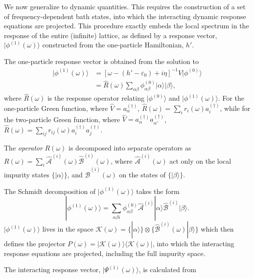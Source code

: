 \documentclass[aps,twocolumn,nobibnotes]{revtex4}
\begin{document}
We now generalize to dynamic quantities. This requires the construction of a set of frequency-dependent bath states, into which the
interacting dynamic response equations are projected. This procedure exactly embeds the local spectrum in the response of the entire (infinite) lattice, 
as defined by a response vector, $|\phi^{(1)}(\omega) \rangle$ constructed from the one-particle Hamiltonian, $h'$.
\begin{inparaenum}
\item The one-particle response vector is obtained from the solution to
\begin{align}
|\phi^{(1)}(\omega) \rangle &= \left[ \omega-(h'-\varepsilon_0)+i\eta \right]^{-1} {\hat V} |\phi^{(0)}\rangle  \nonumber \\ 
                            &= {\hat R}(\omega) \sum_{\alpha \beta} \phi^{(0)}_{\alpha \beta} |\alpha \rangle |\beta \rangle    ,
\end{align}
where ${\hat R}(\omega)$ is the response operator relating $| \phi^{(0)} \rangle$ and $| \phi^{(1)}(\omega) \rangle$. For the one-particle Green 
function, where ${\hat V} = a_{\alpha}^{(\dagger)}$, ${\hat R}(\omega) = \sum_i r_i(\omega) a_i^{(\dagger)}$, while for the two-particle Green function, 
where ${\hat V}=a_{\alpha}^{(\dagger)} a_{\alpha'}^{(\dagger)}$, ${\hat R}(\omega) = \sum_{ij} r_{ij}(\omega) a_i^{(\dagger)} a_j^{(\dagger)}$.
\item The {\em operator} $R(\omega)$ is decomposed into separate operators as $R(\omega) = \sum_i {\hat {\mathcal{A}}}^{(i)}(\omega) {\hat {\mathcal{B}}}^{(i)}(\omega)$, 
where ${\hat {\mathcal{A}}}^{(i)}(\omega)$ act only on the local impurity states $\{ |\alpha \rangle \}$, and ${\hat {\mathcal{B}}}^{(i)}(\omega)$ on the states of $\{ |\beta\rangle \}$.
\item The Schmidt decomposition of $| \phi^{(1)}(\omega) \rangle$ takes the form
\begin{equation}
|\phi^{(1)}(\omega) \rangle = \sum_{\alpha \beta i} \phi^{(0)}_{\alpha \beta} {\hat {\mathcal{A}}}^{(i)} |\alpha \rangle {\hat {\mathcal{B}}}^{(i)} |\beta \rangle .
\end{equation}
$| \phi^{(1)}(\omega) \rangle$ lives in the space $\mathcal{K}(\omega) = \{ |\alpha \rangle \} \otimes \{\hat {\mathcal{B}}^{(i)}(\omega) | \beta \rangle \}$ which 
then defines the projector $P(\omega) = |\mathcal{K}(\omega)\rangle \langle \mathcal{K}(\omega) |$, into which the interacting response equations are projected, including the full impurity space.
\item The interacting response vector, $|\Psi^{(1)} (\omega) \rangle$, is calculated from

\end{inparaenum}
\end{document}
